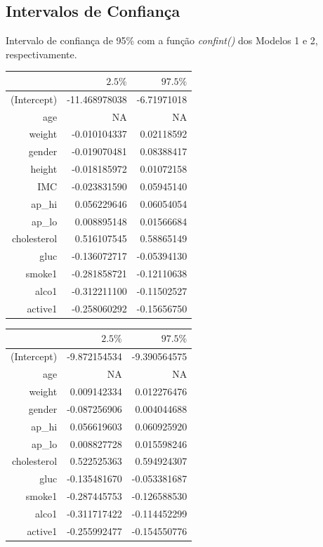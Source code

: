 \documentclass[article,11pt,a4paper,brazil]{abntex2}
\begin{document}
	\subsection{Intervalos de Confiança}
	\noindent Intervalo de confiança de 95\% com a função \textit{confint()} dos Modelos 1 e 2, respectivamente.
	\begin{center}
		\begin{minipage}{0.45\textwidth}
			\centering
			\begin{tabular}{rrr} 
				& $2.5\%$ & $97.5\%$ \\
				\hline
				(Intercept) & -11.468978038 & -6.71971018 \\
				age & $\mathrm{NA}$ & $\mathrm{NA}$ \\
				weight & -0.010104337 & 0.02118592 \\
				gender & -0.019070481 & 0.08388417 \\
				height & -0.018185972 & 0.01072158 \\
				IMC & -0.023831590 & 0.05945140 \\
				ap\_hi & 0.056229646 & 0.06054054 \\
				ap\_lo & 0.008895148 & 0.01566684 \\
				cholesterol & 0.516107545 & 0.58865149 \\
				gluc & -0.136072717 & -0.05394130 \\
				smoke1 & -0.281858721 & -0.12110638 \\
				alco1 & -0.312211100 & -0.11502527 \\
				active1 & -0.258060292 & -0.15656750 \\
			\end{tabular}
		\end{minipage}
		\hfill
		\begin{minipage}{0.45\textwidth}
			\centering
			\begin{tabular}{rrr} 
				& $2.5\%$ & $97.5\%$ \\
				\hline
				(Intercept) & -9.872154534 & -9.390564575 \\
				age & $\mathrm{NA}$ & $\mathrm{NA}$ \\
				weight & 0.009142334 & 0.012276476 \\
				gender & -0.087256906 & 0.004044688 \\
				ap\_hi & 0.056619603 & 0.060925920 \\
				ap\_lo & 0.008827728 & 0.015598246 \\
				cholesterol & 0.522525363 & 0.594924307 \\
				gluc & -0.135481670 & -0.053381687 \\
				smoke1 & -0.287445753 & -0.126588530 \\
				alco1 & -0.311717422 & -0.114452299 \\
				active1 & -0.255992477 & -0.154550776 \\
			\end{tabular}
		\end{minipage}
	\end{center}
\end{document}

